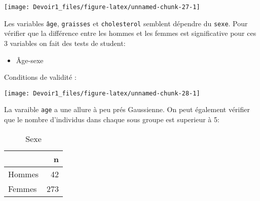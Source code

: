 \documentclass[]{article}
\newenvironment{Shaded}{\begin{snugshade}}{\end{snugshade}}
\newcommand{\KeywordTok}[1]{\textcolor[rgb]{0.13,0.29,0.53}{\textbf{#1}}}
\newcommand{\DataTypeTok}[1]{\textcolor[rgb]{0.13,0.29,0.53}{#1}}
\newcommand{\DecValTok}[1]{\textcolor[rgb]{0.00,0.00,0.81}{#1}}
\newcommand{\StringTok}[1]{\textcolor[rgb]{0.31,0.60,0.02}{#1}}
\newcommand{\OperatorTok}[1]{\textcolor[rgb]{0.81,0.36,0.00}{\textbf{#1}}}
\newcommand{\NormalTok}[1]{#1}
\providecommand{\tightlist}{%
  \setlength{\itemsep}{0pt}\setlength{\parskip}{0pt}}
\begin{document}
\texttt{[image: Devoir1\_files/figure-latex/unnamed-chunk-27-1]}

Les variables \texttt{âge}, \texttt{graisses} et \texttt{cholesterol}
semblent dépendre du \texttt{sexe}. Pour vérifier que la différence
entre les hommes et les femmes est significative pour ces 3 variables on
fait des tests de student:

\begin{itemize}
\tightlist
\item
  Âge-sexe
\end{itemize}

Conditions de validité :

\begin{Shaded}
\end{Shaded}

\texttt{[image: Devoir1\_files/figure-latex/unnamed-chunk-28-1]}

La varaible \texttt{age} a une allure à peu prés Gaussienne. On peut
également vérifier que le nombre d'individus dans chaque sous groupe est
superieur à 5:

\begin{Shaded}
\end{Shaded}

\begin{table}

\caption{\label{tab:unnamed-chunk-29}Sexe}
\centering
\begin{tabular}[t]{l|r}
\hline
  & n\\
\hline
Hommes & 42\\
\hline
Femmes & 273\\
\hline
\end{tabular}
\end{table}
\end{document}
